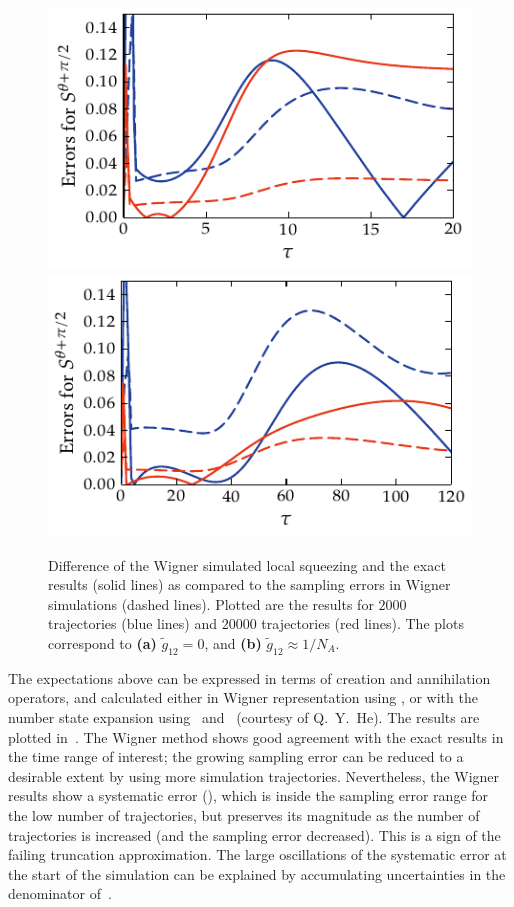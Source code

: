\begin{figure}
    \centerline{%
    \includegraphics{figures_generated/exact/squeezing_nocc_err.pdf}%
    \includegraphics{figures_generated/exact/squeezing_cc_err.pdf}}

    \caption{
    Difference of the Wigner simulated local squeezing and the exact results (solid lines) as compared to the sampling errors in Wigner simulations (dashed lines).
    Plotted are the results for $2000$ trajectories (blue lines) and $20000$ trajectories (red lines).
    The plots correspond to \textbf{(a)} $\tilde{g}_{12} = 0$, and \textbf{(b)} $\tilde{g}_{12} \approx 1 / N_A$.}

    \label{fig:wigner-bec:mm:squeezing-error-comparison}
\end{figure}

The expectations above can be expressed in terms of creation and annihilation operators, and calculated either in Wigner representation using , or with the number state expansion using~ and~ (courtesy of Q.~Y.~He).
The results are plotted in~.
The Wigner method shows good agreement with the exact results in the time range of interest; the growing sampling error can be reduced to a desirable extent by using more simulation trajectories.
Nevertheless, the Wigner results show a systematic error (), which is inside the sampling error range for the low number of trajectories, but preserves its magnitude as the number of trajectories is increased (and the sampling error decreased).
This is a sign of the failing truncation approximation.
The large oscillations of the systematic error at the start of the simulation can be explained by accumulating uncertainties in the denominator of~.

